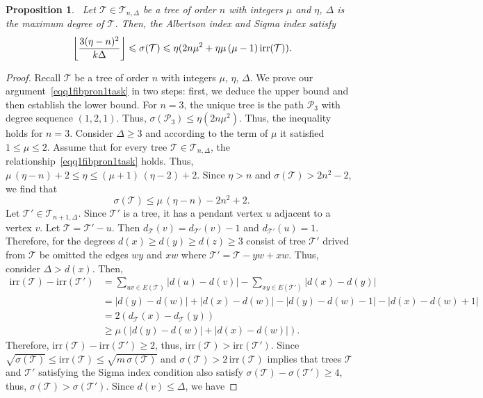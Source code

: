\documentclass[12pt, a4paper]{article}
\newtheorem{proposition}{Proposition}[section]
\newcommand{\TT}{\mathcal{T}}
\newcommand{\irr}{\mathrm{irr}}
\DeclarePairedDelimiter\floor{\lfloor}{\rfloor}
\begin{document}
\begin{proposition}~\label{fibpron1task}
Let $\TT\in \TT_{n,\Delta}$ be a tree of order $n$ with integers $\mu$ and $\eta$, $\Delta$ is the maximum degree of $\TT$. Then, the Albertson index and Sigma index satisfy
\begin{equation}~\label{eqq1fibpron1task}
\floor*{\frac{3(\eta-n)^2}{k\Delta}}  \leqslant \sigma(\TT) \leqslant \eta(2n\mu^2+\eta\mu\,(\mu-1)\,\irr(\TT)).
\end{equation}
\end{proposition}
\begin{proof}
Recall $\TT$ be a tree of order $n$ with integers $\mu$, $\eta$, $\Delta$. We prove our argument~\eqref{eqq1fibpron1task} in two steps: first, we deduce the upper bound and then establish the lower bound. For $n=3$, the unique tree is the path $\mathcal{P}_3$ with degree sequence $(1,2,1)$. Thus, $\sigma(\mathcal{P}_3)\leqslant \eta(2n\mu^2).$ Thus, the inequality holds for $n=3$. Consider $\Delta\geqslant 3$ and according to the term of $\mu$ it satisfied $1\leqslant \mu \leqslant 2$. Assume that for every tree $\TT\in\TT_{n,\Delta}$, the relationship~\eqref{eqq1fibpron1task} holds.  Thus, $\mu\,(\eta-n)+2\leqslant \eta \leqslant (\mu+1)\,(\eta-2)+2$. Since $\eta>n$ and $\sigma(\TT)>2n^2-2$, we find that 
\begin{equation}~\label{eqq2fibpron1task}
\sigma(\TT)\leqslant  \mu\,(\eta-n)-2n^2+2.
\end{equation}
Let $\TT' \in \TT_{n+1,\Delta}$. Since $\TT'$ is a tree, it has a pendant vertex $u$ adjacent to a vertex $v$. Let $\TT=\TT'-u$. Then $d_{\TT}(v)=d_{\TT'}(v)-1$ and $d_{\TT'}(u)=1.$ 
Therefore, for the degrees $d(x)\geqslant d(y) \geqslant d(z) \geqslant 3$ consist of tree $\TT'$ drived from $\TT$ be omitted the edges $wy$ and $xw$ where $\TT'=\TT-yw+xw$. Thus, consider $\Delta>d(x)$. Then, 
\begin{align*}
\irr(\TT)-\irr(\TT')&=\sum_{uv\in E(\TT)}|d(u)-d(v)|-\sum_{xy\in E(\TT')}|d(x)-d(y)|\\
&=|d(y)-d(w)|+|d(x)-d(w)|-|d(y)-d(w)-1|-|d(x)-d(w)+1|\\
&=2(d_\TT(x)-d_\TT(y))\\
&\geqslant \mu \left(|d(y)-d(w)|+|d(x)-d(w)|\right).
\end{align*}
Therefore, $\irr(\TT)-\irr(\TT')\geqslant 2$, thus, $\irr(\TT)>\irr(\TT')$. Since $\sqrt{\sigma(\TT)}\leqslant \irr(\TT)\leqslant \sqrt{m\,\sigma(\TT)}$ and $\sigma(\TT)>2\,\irr(\TT)$ implies that trees $\TT$ and $\TT'$ satisfying the Sigma index condition also satisfy $\sigma(\TT)-\sigma(\TT')\geqslant 4$, thus, $\sigma(\TT)>\sigma(\TT')$. Since $d(v) \leqslant \Delta$, we have

\end{proof}
\end{document}
